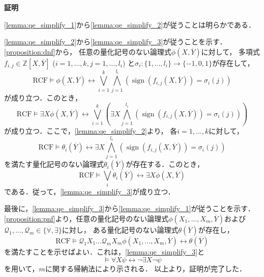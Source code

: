 \documentclass[uplatex, dvipdfmx]{jsarticle}
\makeatletter
\numberwithin{equation}{section}
\renewenvironment{proof}[1][\proofname]{\par
  \pushQED{\qed}%
  \normalfont \topsep6\p@\@plus6\p@\relax
  \trivlist
  \item\relax
  {\bfseries
  #1\@addpunct{.}}\hspace\labelsep\ignorespaces
}{
  \popQED\endtrivlist\@endpefalse
}
\newcommand{\Z}{\mathbb{Z}}
\newcommand{\Qua}{\mathcal{Q}}
\newcommand{\RCF}{\mathrm{RCF}}
\newcommand{\map}[3]{{#1}\colon{#2}\rightarrow{#3}}
\DeclareMathOperator{\sign}{sign}
\theoremstyle{definition}
\renewcommand{\proofname}{\textbf{証明}}
\makeatother
\begin{document}
\begin{proof}
     \ref{lemma:qe_simplify_1}から\ref{lemma:qe_simplify_2}が従うことは明らかである．

     \ref{lemma:qe_simplify_2}から\ref{lemma:qe_simplify_3}が従うことを示す．
     \cref{proposition:dnf}から，%
     任意の量化記号のない論理式$\phi(X, \overline{Y})$に対して，
     多項式$f_{i,j} \in \Z[X, \overline{Y}]$ ($i=1, \dots, k, j=1, \dots, l_i$)
     と$\map{\sigma_i}{\{1, \dots, l_i\}}{\{-1,0,1\}}$が存在して，
     \begin{equation}
          \RCF \models
          \phi\left(X, \overline{Y}\right) \leftrightarrow 
          \bigvee_{i=1}^k \bigwedge_{j=1}^{l_i} \left(\sign\left(f_{i,j}\left(X, \overline{Y}\right)\right) = \sigma_i(j)\right)
     \end{equation}
     が成り立つ．このとき，
     \begin{equation}
          \RCF \models 
          \exists X \phi\left(X, \overline{Y}\right) \leftrightarrow  
          \bigvee_{i=1}^k \left(\exists X \bigwedge_{j=1}^{l_i} \left(\sign\left(f_{i,j}\left(X, \overline{Y}\right)\right) = \sigma_i(j)\right)\right)
     \end{equation}
     が成り立つ．ここで，\ref{lemma:qe_simplify_2}より，
     各$i=1, \dots, k$に対して，
     \begin{equation}
          \RCF \models
          \theta_i\left(\overline{Y}\right) \leftrightarrow 
          \exists X \bigwedge_{j=1}^{l_i} \left(\sign\left(f_{i,j}\left(X, \overline{Y}\right)\right) = \sigma_i(j)\right)
     \end{equation}
     を満たす量化記号のない論理式$\theta_i\left(\overline{Y}\right)$が存在する．このとき，
     \begin{equation}
          \RCF \models
          \bigvee_i \theta_i\left(\overline{Y}\right)\leftrightarrow
          \exists X \phi\left(X, \overline{Y}\right) 
     \end{equation}
     である．従って，\ref{lemma:qe_simplify_3}が成り立つ．

     最後に，\ref{lemma:qe_simplify_3}から\ref{lemma:qe_simplify_1}が従うことを示す．
     \cref{proposition:pnf}より，任意の量化記号のない論理式$\phi\left(X_1, \dots, X_m, \overline{Y}\right)$および$\Qua_1, \dots, \Qua_m \in \{\forall, \exists\}$に対し，
     ある量化記号のない論理式$\theta\left(\overline{Y}\right)$が存在し，
     \begin{equation}
          \RCF \models 
          \Qua_1 X_1 \dots\Qua_m X_m \phi\left(X_1, \dots, X_m, \overline{Y}\right) \leftrightarrow \theta\left(\overline{Y}\right)
     \end{equation}
     を満たすことを示せばよい．これは，\ref{lemma:qe_simplify_3}と
     \begin{equation}
          \models \forall X \psi \leftrightarrow \lnot \exists X \lnot \psi
     \end{equation}
     を用いて，$m$に関する帰納法により示される．
     以上より，証明が完了した．
\end{proof}
\end{document}
